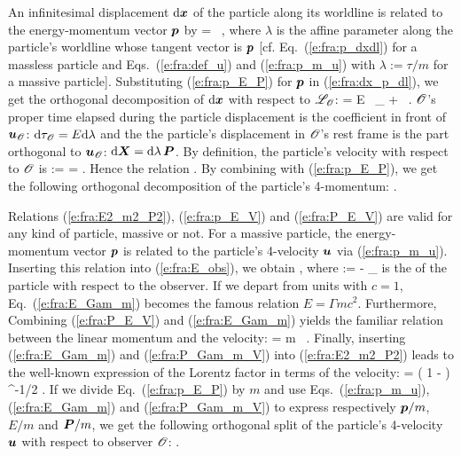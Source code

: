 An infinitesimal displacement $\mathrm{d}\bm{x}$ of the particle along its worldline
is related to the energy-momentum vector $\bm{p}$ by
\be \label{e:fra:dx_p_dl}
    \D{} =  \, \D\lambda,
\ee
where $\lambda$ is the affine parameter along the particle's worldline
whose tangent vector is $\bm{p}$ [cf. Eq.~(\ref{e:fra:p_dxdl}) for a massless
particle and Eqs.~(\ref{e:fra:def_u}) and (\ref{e:fra:p_m_u}) with
$\lambda := \tau/m$ for a massive particle]. Substituting (\ref{e:fra:p_E_P})
for $\bm{p}$ in (\ref{e:fra:dx_p_dl}), we get the orthogonal decomposition
of $\mathrm{d}\bm{x}$ with respect to $\mathscr{L}_{\mathscr{O}}$:
\be
    \D{} = E \D\lambda \, _{\Obs} + \D\lambda\,   .
\ee
$\mathscr{O}$'s proper time elapsed during the particle displacement is the
coefficient in front of $\bm{u}_{\mathscr{O}}$: $\mathrm{d}\tau_{\mathscr{O}} = E \mathrm{d}\lambda$ and the
the particle's displacement in $\mathscr{O}$'s rest frame is the part orthogonal
to $\bm{u}_{\mathscr{O}}$: $\mathrm{d}\bm{X} = \mathrm{d}\lambda\,  \bm{P}$. By definition,
the particle's velocity with respect to $\mathscr{O}$ is
\be
     :=  = .
\ee
Hence the relation
\be \label{e:fra:P_E_V}
     .
\ee
By combining with (\ref{e:fra:p_E_P}), we get the following
orthogonal decomposition of the particle's 4-momentum:
\be \label{e:fra:p_E_V}
     .
\ee

Relations (\ref{e:fra:E2_m2_P2}), (\ref{e:fra:p_E_V}) and (\ref{e:fra:P_E_V}) are valid for any kind of particle, massive or not.
For a massive particle, the energy-momentum vector $\bm{p}$ is related to the
particle's 4-velocity $\bm{u}$ via (\ref{e:fra:p_m_u}). Inserting this relation
into (\ref{e:fra:E_obs}), we obtain
\be \label{e:fra:E_Gam_m}
    ,
\ee
where
\be \label{e:fra:def_Lorentz_factor}
    \Gamma := - _{\Obs}\cdot{}
\ee
is the  of the particle with respect
to the observer. If we depart from units with $c=1$, Eq.~(\ref{e:fra:E_Gam_m})
becomes the famous relation $E = \Gamma m c^2$. Furthermore,
Combining (\ref{e:fra:P_E_V}) and (\ref{e:fra:E_Gam_m}) yields the familiar
relation between the linear momentum and the velocity:
\be \label{e:fra:P_Gam_m_V}
     = \Gamma m \,  .
\ee
Finally, inserting (\ref{e:fra:E_Gam_m}) and (\ref{e:fra:P_Gam_m_V}) into
(\ref{e:fra:E2_m2_P2}) leads to the well-known expression of the Lorentz factor in
terms of the velocity:
\be \label{e:fra:Gam_V2}
    \Gamma = \left( 1 - \cdot{} \right) ^{-1/2} .
\ee
If we divide Eq.~(\ref{e:fra:p_E_P}) by $m$ and use Eqs.~(\ref{e:fra:p_m_u}),
(\ref{e:fra:E_Gam_m}) and (\ref{e:fra:P_Gam_m_V})
to express respectively $\bm{p}/m$, $E/m$ and $\bm{P}/m$, we get
the following orthogonal split of the particle's 4-velocity $\bm{u}$ with
respect to observer $\mathscr{O}$:
\be \label{e:fra:u_Gamma_V}
   .
\ee

